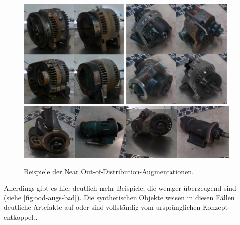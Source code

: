 \begin{figure}
	\centering
	\includegraphics[width=0.48\textwidth]{figure_results_ood-augs_good_1.png}%
	\hspace{0.02\textwidth}\includegraphics[width=0.48\textwidth]{figure_results_ood-augs_good_3.png}\vspace{0.01\textwidth}
	\includegraphics[width=0.98\textwidth]{figure_results_ood-augs_good_4.png}
	\caption{Beispiele der Near Out-of-Distribution-Augmentationen.}
	\label{fig:ood-augs-good}
\end{figure}

Allerdings gibt es hier deutlich mehr Beispiele, die weniger überzeugend sind (siehe \autoref{fig:ood-augs-bad}). Die synthetischen Objekte weisen in diesen Fällen deutliche Artefakte auf oder sind vollständig vom ursprünglichen Konzept entkoppelt.

